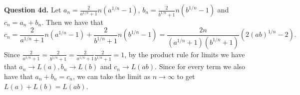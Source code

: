 \documentclass[letterpaper, reqno,11pt]{article}
\begin{document}
{\medskip\noindent\bf Question 4d.} Let $a_n=\frac{2}{a^{1 /n}+1}n\left( a^{1 /n}-1 \right)$, $b_n=\frac{2}{b^{1 /n}+1}n\left( b^{1 /n}-1 \right)$ and $c_n=a_n+b_n$. Then we have that
\[
c_n=\frac{2}{a^{1 /n}+1}n\left( a^{1 /n}-1 \right)+\frac{2}{b^{1 /n}+1}n\left( b^{1 /n}-1 \right)=\frac{2n}{(a^{1 /n}+1)(b^{1/n}+1)} \left( 2(ab)^{1 /n}-2 \right) 
.\]
Since $\frac{2}{a^{1 /n}+1}=\frac{2}{b^{1 /n}+1}=\frac{2}{a^{1 /n}+1}\frac{2}{b^{1 /n}+1}=1$, by the product rule for limits we have that $a_n\to L(a),b_n\to L(b)$ and $c_n\to L(ab)$. Since for every term we also have that $a_n+b_n=c_n$, we can take the limit as $n\to\infty$ to get $L(a)+L(b)=L(ab)$.

\newpage\phantom{blabla}
\newpage
\end{document}
